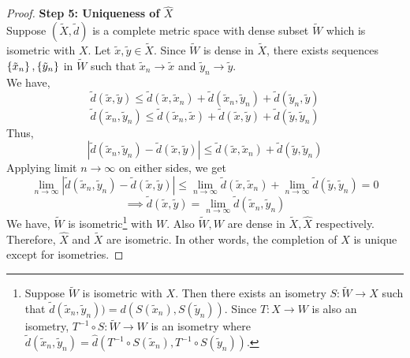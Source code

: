 \begin{proof}
	\textbf{Step 5: Uniqueness of $\hat{X}$}\\
	Suppose $(\tilde{X},\tilde{d})$ is a complete metric space with dense subset $\tilde{W}$ which is isometric with $X$.
	Let $\tilde{x},\tilde{y} \in \tilde{X}$.
	Since $\tilde{W}$ is dense in $\tilde{X}$, there exists sequences $\left\{\tilde{x}_n\right\},\left\{\tilde{y}_n\right\}$ in $\tilde{W}$ such that $\tilde{x}_n \to \tilde{x}$ and $\tilde{y}_n \to \tilde{y}$.\\
	We have,
	\[ \tilde{d}(\tilde{x},\tilde{y}) \le \tilde{d}(\tilde{x},\tilde{x}_n) + \tilde{d}(\tilde{x}_n,\tilde{y}_n) + \tilde{d}(\tilde{y}_n,\tilde{y}) \]
	\[ \tilde{d}(\tilde{x}_n,\tilde{y}_n) \le \tilde{d}(\tilde{x}_n,\tilde{x}) + \tilde{d}(\tilde{x},\tilde{y}) + \tilde{d}(\tilde{y},\tilde{y}_n) \]
	Thus,
	\[ | \tilde{d}(\tilde{x}_n,\tilde{y}_n) - \tilde{d}(\tilde{x},\tilde{y}) | \le \tilde{d}(\tilde{x},\tilde{x}_n) + \tilde{d}(\tilde{y},\tilde{y}_n) \]
	Applying limit $n \to \infty$ on either sides, we get
	\[ \lim_{n \to \infty} | \tilde{d}(\tilde{x}_n,\tilde{y}_n) - \tilde{d}(\tilde{x},\tilde{y}) | \le \lim_{n \to \infty} \tilde{d}(\tilde{x},\tilde{x}_n) + \lim_{n \to \infty} \tilde{d}(\tilde{y},\tilde{y}_n) = 0 \]
	\[ \implies \tilde{d}(\tilde{x},\tilde{y}) = \lim_{n \to \infty} \tilde{d}(\tilde{x}_n,\tilde{y}_n) \]
	We have, $\tilde{W}$ is isometric\dag\footnote{
		Suppose $\tilde{W}$ is isometric with $X$.
		Then there exists an isometry $S : \tilde{W} \to X$ such that $\tilde{d}(\tilde{x}_n,\tilde{y}_n)) = d(S(\tilde{x}_n),S(\tilde{y}_n))$.
		Since $T : X \to W$ is also an isometry, $T^{-1} \circ S : \tilde{W} \to W$ is an isometry where $\tilde{d}(\tilde{x}_n,\tilde{y}_n) = \hat{d}(T^{-1}\circ S(\tilde{x}_n), T^{-1}\circ S(\tilde{y}_n)).$}
		with $W$.
	Also $\tilde{W},W$ are dense in $\tilde{X},\hat{X}$ respectively.
	Therefore, $\hat{X}$ and $\tilde{X}$ are isometric.
	In other words, the completion of $X$ is unique except for isometries.
\end{proof}

